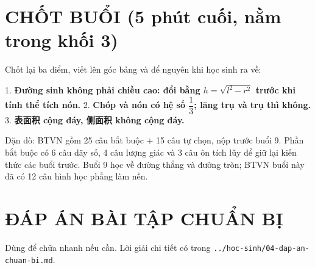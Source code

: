 \documentclass[11pt, a4paper]{article}
\begin{document}

\section{CHỐT BUỔI (5 phút cuối, nằm trong khối 3)}

Chốt lại ba điểm, viết lên góc bảng và để nguyên khi học sinh ra về:

1. \textbf{Đường sinh không phải chiều cao: đổi bằng $h = \sqrt{l^2-r^2}$ trước khi tính thể tích nón.}
2. \textbf{Chóp và nón có hệ số $\dfrac{1}{3}$; lăng trụ và trụ thì không.}
3. \textbf{表面积 cộng đáy, 侧面积 không cộng đáy.}

Dặn dò: BTVN gồm 25 câu bắt buộc + 15 câu tự chọn, nộp trước buổi 9. Phần bắt buộc có 6 câu dãy số, 4 câu lượng giác và 3 câu ôn tích lũy để giữ lại kiến thức các buổi trước. Buổi 9 học về đường thẳng và đường tròn; BTVN buổi này đã có 12 câu hình học phẳng làm nền.

\section{ĐÁP ÁN BÀI TẬP CHUẨN BỊ}

Dùng để chữa nhanh nếu cần. Lời giải chi tiết có trong \texttt{../hoc-sinh/04-dap-an-chuan-bi.md}.

\end{document}
